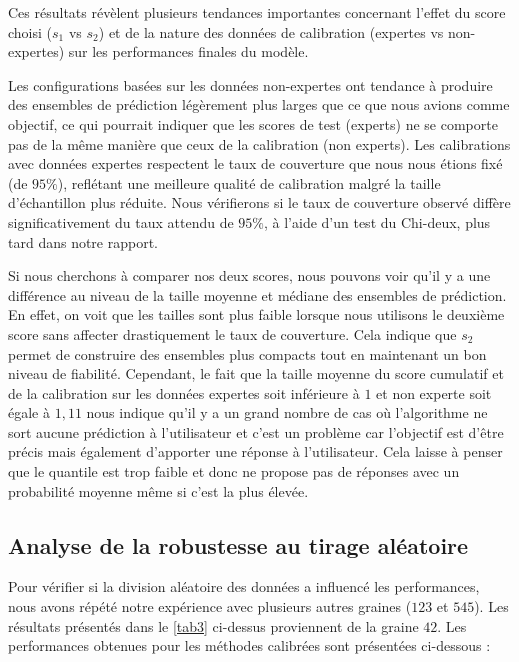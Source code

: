 \documentclass[a4paper,12pt]{article}
\begin{document}
Ces résultats révèlent plusieurs tendances importantes concernant l'effet du score choisi ($s_1$ vs $s_2$) et de la nature des données de calibration (expertes vs non-expertes) sur les performances finales du modèle.

\vspace{0.2cm}

Les configurations basées sur les données non-expertes ont tendance à produire des ensembles de prédiction légèrement plus larges que ce que nous avions comme objectif, ce qui pourrait indiquer que les scores de test (experts) ne se comporte pas de la même manière que ceux de la calibration (non experts). Les calibrations avec données expertes respectent le taux de couverture que nous nous étions fixé (de $95\%$), reflétant une meilleure qualité de calibration malgré la taille d’échantillon plus réduite. Nous vérifierons si le taux de couverture observé diffère significativement du taux attendu de $95 \%$, à l’aide d’un test du Chi-deux, plus tard dans notre rapport.

\vspace{0.2cm}

Si nous cherchons à comparer nos deux scores, nous pouvons voir qu'il y a une différence au niveau de la taille moyenne et médiane des ensembles de prédiction. En effet, on voit que les tailles sont plus faible lorsque nous utilisons le deuxième score sans affecter drastiquement le taux de couverture. Cela indique que $s_2$ permet de construire des ensembles plus compacts tout en maintenant un bon niveau de fiabilité. Cependant, le fait que la taille moyenne du score cumulatif et de la calibration sur les données expertes soit inférieure à $1$ et non experte soit égale à $1,11$ nous indique qu'il y a un grand nombre de cas où l'algorithme ne sort aucune prédiction à l'utilisateur et c'est un problème car l'objectif est d'être précis mais également d'apporter une réponse à l'utilisateur. Cela laisse à penser que le quantile est trop faible et donc ne propose pas de réponses avec un probabilité moyenne même si c'est la plus élevée.


\subsection{Analyse de la robustesse au tirage aléatoire}

Pour vérifier si la division aléatoire des données a influencé les performances, nous avons répété notre expérience avec plusieurs autres graines ($123$ et $545$). Les résultats présentés dans le \autoref{tab3} ci-dessus proviennent de la graine $42$. Les performances obtenues pour les méthodes calibrées sont présentées ci-dessous :
\end{document}
